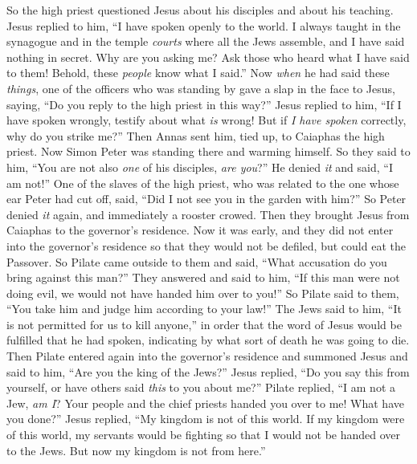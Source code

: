 \begin{biblechapter}
 So the high priest questioned Jesus about his disciples and about his teaching.
\verse Jesus replied to him, “I have spoken openly to the world. I always taught in the synagogue and in the temple \textit{courts} where all the Jews assemble, and I have said nothing in secret.
\verse Why are you asking me? Ask those who heard what I have said to them! Behold, these \textit{people} know what I said.”
\verse Now \textit{when} he had said these \textit{things}, one of the officers who was standing by gave a slap in the face to Jesus, saying, “Do you reply to the high priest in this way?”
\verse Jesus replied to him, “If I have spoken wrongly, testify about what \textit{is} wrong! But if \textit{I have spoken} correctly, why do you strike me?”
\verse Then Annas sent him, tied up, to Caiaphas the high priest.
 Now Simon Peter was standing there and warming himself. So they said to him, “You are not also \textit{one} of his disciples, \textit{are you}?” He denied \textit{it} and said, “I am not!”
\verse One of the slaves of the high priest, who was related to the one whose ear Peter had cut off, said, “Did I not see you in the garden with him?”
\verse So Peter denied \textit{it} again, and immediately a rooster crowed.
 Then they brought Jesus from Caiaphas to the governor’s residence. Now it was early, and they did not enter into the governor’s residence so that they would not be defiled, but could eat the Passover.
\verse So Pilate came outside to them and said, “What accusation do you bring against this man?”
\verse They answered and said to him, “If this man were not doing evil, we would not have handed him over to you!”
\verse So Pilate said to them, “You take him and judge him according to your law!” The Jews said to him, “It is not permitted for us to kill anyone,”
\verse in order that the word of Jesus would be fulfilled that he had spoken, indicating by what sort of death he was going to die.
 Then Pilate entered again into the governor’s residence and summoned Jesus and said to him, “Are you the king of the Jews?”
\verse Jesus replied, “Do you say this from yourself, or have others said \textit{this} to you about me?”
\verse Pilate replied, “I am not a Jew, \textit{am I}? Your people and the chief priests handed you over to me! What have you done?”
\verse Jesus replied, “My kingdom is not of this world. If my kingdom were of this world, my servants would be fighting so that I would not be handed over to the Jews. But now my kingdom is not from here.”

\end{biblechapter}
